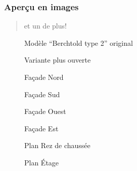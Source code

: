 \documentclass[a4paper,12pt,french]{sphinxmanual}
\begin{document}
\subsubsection{Aperçu en images}
\label{init_su+acad/001_intro:apercu-en-images}\begin{quote}

et un de plus!
\end{quote}
\begin{figure}[htbp]
\centering
\capstart

\noindent{}
\caption{Modèle ``Berchtold type 2'' original}\label{init_su+acad/001_intro:fig-pers-porkeno}\label{init_su+acad/001_intro:id1}\end{figure}
\begin{figure}[htbp]
\centering
\capstart

\noindent{}
\caption{Variante plus ouverte}\label{init_su+acad/001_intro:id2}\end{figure}
\begin{figure}[htbp]
\centering
\capstart

\noindent{}
\caption{Façade Nord}\label{init_su+acad/001_intro:id3}\end{figure}
\begin{figure}[htbp]
\centering
\capstart

\noindent{}
\caption{Façade Sud}\label{init_su+acad/001_intro:id4}\end{figure}
\begin{figure}[htbp]
\centering
\capstart

\noindent{}
\caption{Façade Ouest}\label{init_su+acad/001_intro:id5}\end{figure}
\begin{figure}[htbp]
\centering
\capstart

\noindent{}
\caption{Façade Est}\label{init_su+acad/001_intro:id6}\end{figure}
\begin{figure}[htbp]
\centering
\capstart

\noindent{}
\caption{Plan Rez de chaussée}\label{init_su+acad/001_intro:id7}\end{figure}
\begin{figure}[htbp]
\centering
\capstart

\noindent{}
\caption{Plan Étage}\label{init_su+acad/001_intro:id8}\end{figure}
\end{document}
